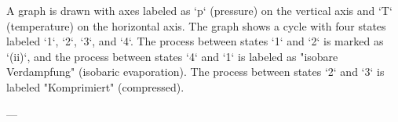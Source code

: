 A graph is drawn with axes labeled as `p` (pressure) on the vertical axis and `T` (temperature) on the horizontal axis. The graph shows a cycle with four states labeled `1`, `2`, `3`, and `4`. The process between states `1` and `2` is marked as `(ii)`, and the process between states `4` and `1` is labeled as "isobare Verdampfung" (isobaric evaporation). The process between states `2` and `3` is labeled "Komprimiert" (compressed).

---